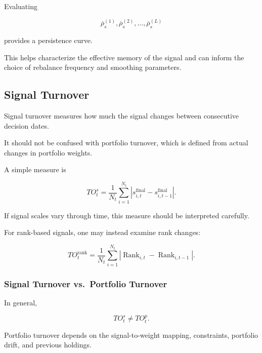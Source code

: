 \documentclass[11pt,a4paper]{article}
\begin{document}
Evaluating

\begin{equation}
\overline{\rho}_s^{(1)},
\overline{\rho}_s^{(2)},
\ldots,
\overline{\rho}_s^{(L)}
\end{equation}

provides a persistence curve.

This helps characterize the effective memory of the signal and can inform the
choice of rebalance frequency and smoothing parameters.


\subsection{Signal Turnover}
\label{subsec:signal_turnover}

Signal turnover measures how much the signal changes between consecutive
decision dates.

It should not be confused with portfolio turnover, which is defined from actual
changes in portfolio weights.

A simple measure is

\begin{equation}
\boxed{
TO_t^{s}
=
\frac{1}{N_t}
\sum_{i=1}^{N_t}
\left|
s_{i,t}^{\mathrm{final}}
-
s_{i,t-1}^{\mathrm{final}}
\right|.
}
\end{equation}

If signal scales vary through time, this measure should be interpreted
carefully.

For rank-based signals, one may instead examine rank changes:

\begin{equation}
\boxed{
TO_t^{\mathrm{rank}}
=
\frac{1}{N_t}
\sum_{i=1}^{N_t}
\left|
\operatorname{Rank}_{i,t}
-
\operatorname{Rank}_{i,t-1}
\right|.
}
\end{equation}


\subsubsection{Signal Turnover vs.\ Portfolio Turnover}

In general,

\begin{equation}
\boxed{
TO_t^{s}
\neq
TO_t^{p}.
}
\end{equation}

Portfolio turnover depends on the signal-to-weight mapping, constraints,
portfolio drift, and previous holdings.
\end{document}
